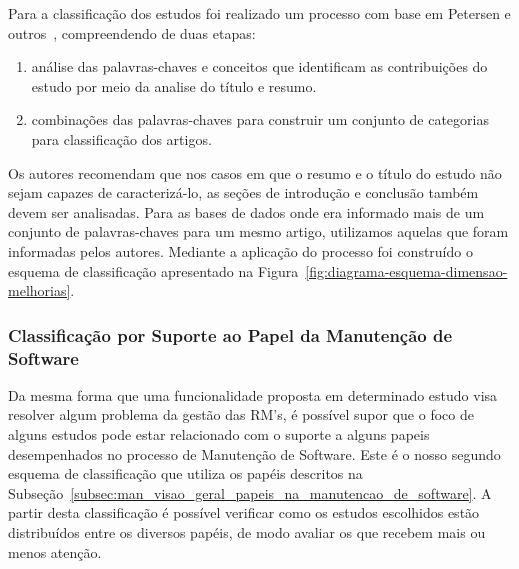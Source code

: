 Para a classificação dos estudos foi realizado um processo com base em Petersen
e outros~\cite{Petersen2008}, compreendendo de duas etapas:

\begin{enumerate}[I]
	\item análise das palavras-chaves e conceitos que
		identificam as contribuições do estudo por meio da analise do título e
		resumo.
	\item combinações das palavras-chaves para construir um conjunto de
		categorias para classificação dos artigos.
\end{enumerate}

Os autores recomendam que nos casos em que o resumo e o título do estudo não
sejam capazes de caracterizá-lo, as seções de introdução e conclusão também
devem ser analisadas. Para as bases de dados onde era informado mais de um
conjunto de palavras-chaves para um mesmo artigo, utilizamos aquelas que foram
informadas pelos autores. Mediante a aplicação do processo foi construído o
esquema de classificação apresentado na
Figura~\ref{fig:diagrama-esquema-dimensao-melhorias}.


\subsubsection{Classificação por Suporte ao Papel da Manutenção de Software}
\label{subsubsec:map-esquema-suporte-papel-man}

Da mesma forma que uma funcionalidade proposta em determinado estudo visa
resolver algum problema da gestão das RM's, é possível supor que o foco de
alguns estudos pode estar relacionado com o suporte a alguns papeis
desempenhados no processo de Manutenção de Software. Este é o nosso segundo
esquema de classificação que utiliza os papéis descritos na
Subseção~\ref{subsec:man_visao_geral_papeis_na_manutencao_de_software}. A partir
desta classificação é possível verificar como os estudos escolhidos estão
distribuídos entre os diversos papéis, de modo avaliar os que recebem mais ou
menos atenção.

